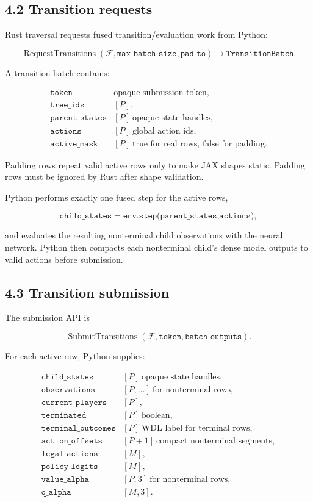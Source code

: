 \documentclass[11pt]{article}
\newcommand{\Forest}{\mathcal{F}}
\newcommand{\RequestTransitions}{\operatorname{RequestTransitions}}
\newcommand{\SubmitTransitions}{\operatorname{SubmitTransitions}}
\begin{document}
\subsection*{4.2 Transition requests}

Rust traversal requests fused transition/evaluation work from Python:

\[
\RequestTransitions(\Forest,\texttt{max\_batch\_size},\texttt{pad\_to})
\rightarrow
\texttt{TransitionBatch}.
\]

A transition batch contains:

\[
\begin{array}{ll}
\texttt{token}          & \text{opaque submission token},\\
\texttt{tree\_ids}      & [P],\\
\texttt{parent\_states} & [P]\ \text{opaque state handles},\\
\texttt{actions}        & [P]\ \text{global action ids},\\
\texttt{active\_mask}   & [P]\ \text{true for real rows, false for padding}.
\end{array}
\]

Padding rows repeat valid active rows only to make JAX shapes static. Padding
rows must be ignored by Rust after shape validation.

Python performs exactly one fused step for the active rows,

\[
\texttt{child\_states}=\texttt{env.step(parent\_states,actions)},
\]

and evaluates the resulting nonterminal child observations with the neural
network. Python then compacts each nonterminal child's dense model outputs to
valid actions before submission.

\subsection*{4.3 Transition submission}

The submission API is

\[
\SubmitTransitions(\Forest,\texttt{token},\texttt{batch outputs}).
\]

For each active row, Python supplies:

\[
\begin{array}{ll}
\texttt{child\_states}       & [P]\ \text{opaque state handles},\\
\texttt{observations}        & [P,\ldots]\ \text{for nonterminal rows},\\
\texttt{current\_players}    & [P],\\
\texttt{terminated}          & [P]\ \text{boolean},\\
\texttt{terminal\_outcomes}  & [P]\ \text{WDL label for terminal rows},\\
\texttt{action\_offsets}     & [P+1]\ \text{compact nonterminal segments},\\
\texttt{legal\_actions}      & [M],\\
\texttt{policy\_logits}      & [M],\\
\texttt{value\_alpha}        & [P,3]\ \text{for nonterminal rows},\\
\texttt{q\_alpha}            & [M,3].
\end{array}
\]
\end{document}
